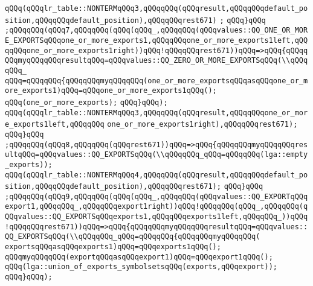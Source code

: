 \verb|qQQq(qQQqlr_table::NONTERMqQQq3,qQQqqQQq(qQQqresult,qQQqqQQqdefault_position,qQQqqQQqdefault_position),qQQqqQQqrest671)|\newline
\verb|;|\newline
\verb|qQQq}qQQq|\newline
\verb|;qQQqqQQq(qQQq7,qQQqqQQq(qQQq(qQQq_,qQQqqQQq(qQQqvalues::QQ_ONE_OR_MORE_EXPORTSqQQqone_or_more_exports1,qQQqqQQqone_or_more_exports1left,qQQqqQQqone_or_more_exports1right))qQQq!qQQqqQQqrest671))qQQq=>qQQq{qQQqqQQqmyqQQqqQQqresultqQQq=qQQqvalues::QQ_ZERO_OR_MORE_EXPORTSqQQq(\\qQQqqQQq_|\newline
\verb|qQQq=qQQqqQQq{qQQqqQQqmyqQQqqQQq(one_or_more_exportsqQQqasqQQqone_or_more_exports1)qQQq=qQQqone_or_more_exports1qQQq();|\newline
\verb|qQQq(one_or_more_exports);|\newline
\verb|qQQq}qQQq);|\newline
\verb|qQQq(qQQqlr_table::NONTERMqQQq3,qQQqqQQq(qQQqresult,qQQqqQQqone_or_more_exports1left,qQQqqQQq|\newline
\verb|one_or_more_exports1right),qQQqqQQqrest671);|\newline
\verb|qQQq}qQQq|\newline
\verb|;qQQqqQQq(qQQq8,qQQqqQQq(qQQqrest671))qQQq=>qQQq{qQQqqQQqmyqQQqqQQqresultqQQq=qQQqvalues::QQ_EXPORTSqQQq(\\qQQqqQQq_qQQq=qQQqqQQq(lga::empty_exports));|\newline
\verb|qQQq(qQQqlr_table::NONTERMqQQq4,qQQqqQQq(qQQqresult,qQQqqQQqdefault_position,qQQqqQQqdefault_position),qQQqqQQqrest671);|\newline
\verb|qQQq}qQQq|\newline
\verb|;qQQqqQQq(qQQq9,qQQqqQQq(qQQq(qQQq_,qQQqqQQq(qQQqvalues::QQ_EXPORTqQQqexport1,qQQqqQQq_,qQQqqQQqexport1right))qQQq!qQQqqQQq(qQQq_,qQQqqQQq(qQQqvalues::QQ_EXPORTSqQQqexports1,qQQqqQQqexports1left,qQQqqQQq_))qQQq!qQQqqQQqrest671))qQQq=>qQQq{qQQqqQQqmyqQQqqQQqresultqQQq=qQQqvalues::QQ_EXPORTSqQQq(\\qQQqqQQq_qQQq=qQQqqQQq{qQQqqQQqmyqQQqqQQq(|\newline
\verb|exportsqQQqasqQQqexports1)qQQq=qQQqexports1qQQq();|\newline
\verb|qQQqmyqQQqqQQq(exportqQQqasqQQqexport1)qQQq=qQQqexport1qQQq();|\newline
\verb|qQQq(lga::union_of_exports_symbolsetsqQQq(exports,qQQqexport));|\newline
\verb|qQQq}qQQq);|\newline
